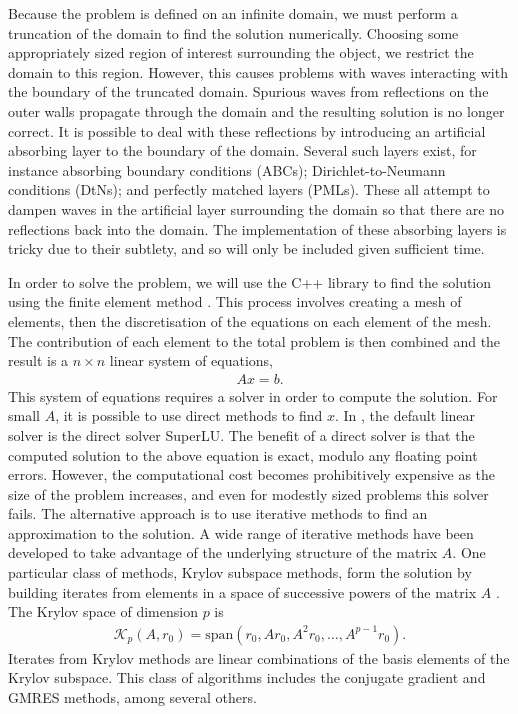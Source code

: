 Because the problem is defined on an infinite domain, we must perform a truncation of the domain to find the solution numerically.
Choosing some appropriately sized region of interest surrounding the object, we restrict the domain to this region.
However, this causes problems with waves interacting with the boundary of the truncated domain.
Spurious waves from reflections on the outer walls propagate through the domain and the resulting solution is no longer correct.
It is possible to deal with these reflections by introducing an artificial absorbing layer to the boundary of the domain.
Several such layers exist, for instance absorbing boundary conditions (ABCs); Dirichlet-to-Neumann conditions (DtNs); and perfectly matched layers (PMLs).
These all attempt to dampen waves in the artificial layer surrounding the domain so that there are no reflections back into the domain.
The implementation of these absorbing layers is tricky due to their subtlety, and so will only be included given sufficient time.




In order to solve the problem, we will use the C++ library \oomph  to find the solution using the finite element method \cite{oomph}.
This process involves creating a mesh of elements, then the discretisation of the equations on each element of the mesh.
The contribution of each element to the total problem is then combined and the result is a $n\times n$ linear system of equations,
\begin{align}
	A x = b.
\end{align}
This system of equations requires a solver in order to compute the solution.
For small $A$, it is possible to use direct methods to find $x$.
In \oomph, the default linear solver is the direct solver SuperLU.
The benefit of a direct solver is that the computed solution to the above equation is exact, modulo any floating point errors.
However, the computational cost becomes prohibitively expensive as the size of the problem increases, and even for modestly sized problems this solver fails.
The alternative approach is to use iterative methods to find an approximation to the solution.
A wide range of iterative methods have been developed to take advantage of the underlying structure of the matrix $A$.
One particular class of methods, Krylov subspace methods, form the solution by building iterates from elements in a space of successive powers of the matrix $A$ \cite{leveque}.
The Krylov space of dimension $p$ is 
\begin{align}
	\mathcal{K}_p(A, r_0) = \mathrm{span}(r_0, Ar_0, A^2 r_0, \ldots, A^{p-1} r_0).
\end{align}
Iterates from Krylov methods are linear combinations of the basis elements of the Krylov subspace.
This class of algorithms includes the conjugate gradient and GMRES methods, among several others.


